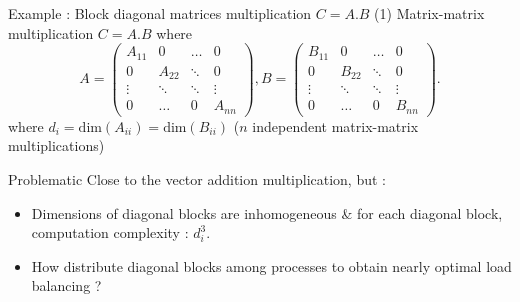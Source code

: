 \documentclass[compress,10pt,aspectratio=169]{beamer}
\begin{document}
\begin{frame}[fragile]{Example : Block diagonal matrices multiplication $C = A.B$ (1)}
    \scriptsize
    Matrix-matrix multiplication $C = A.B$ where
        \[
            A = \left(
                \begin{array}{cccc}
                    A_{11} & 0 & \ldots & 0 \\
                      0    & A_{22} & \ddots & 0 \\
                      \vdots & \ddots & \ddots & \vdots \\
                      0 & \ldots & 0 & A_{nn} 
                \end{array}\right),
            B = \left(
                \begin{array}{cccc}
                    B_{11} & 0 & \ldots & 0 \\
                      0    & B_{22} & \ddots & 0 \\
                      \vdots & \ddots & \ddots & \vdots \\
                      0 & \ldots & 0 & B_{nn} 
                \end{array}\right).
        \]
    where $d_{i} = \mbox{dim}(A_{ii}) = \mbox{dim}(B_{ii})$ ($n$ independent matrix-matrix multiplications)

    \begin{block}{\small Problematic}
        Close to the vector addition multiplication, but :
        \begin{itemize}
            \item Dimensions of diagonal blocks are inhomogeneous \& for each diagonal 
                  block, computation complexity : $d_{i}^{3}$.
            \item How distribute diagonal blocks among processes to obtain nearly optimal load balancing ?
        \end{itemize}
    \end{block}
\end{frame}
\end{document}

